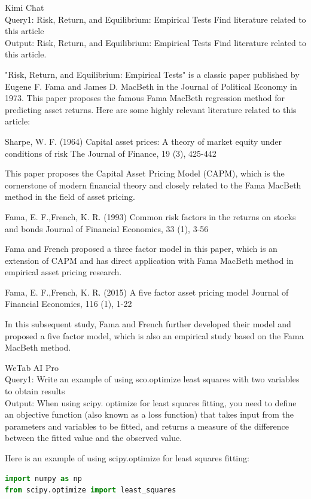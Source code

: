 \documentclass[12pt]{article}  %
\begin{document}
\begin{ReportAiUse}{9}
Kimi Chat  \\
Query1: Risk, Return, and Equilibrium: Empirical Tests Find literature related to this article  \\
Output:  Risk, Return, and Equilibrium: Empirical Tests Find literature related to this article.

"Risk, Return, and Equilibrium: Empirical Tests" is a classic paper published by Eugene F. Fama and James D. MacBeth in the Journal of Political Economy in 1973. This paper proposes the famous Fama MacBeth regression method for predicting asset returns. Here are some highly relevant literature related to this article:

Sharpe, W. F. (1964) Capital asset prices: A theory of market equity under conditions of risk The Journal of Finance, 19 (3), 425-442

This paper proposes the Capital Asset Pricing Model (CAPM), which is the cornerstone of modern financial theory and closely related to the Fama MacBeth method in the field of asset pricing.

Fama, E. F.,French, K. R. (1993) Common risk factors in the returns on stocks and bonds Journal of Financial Economics, 33 (1), 3-56

Fama and French proposed a three factor model in this paper, which is an extension of CAPM and has direct application with Fama MacBeth method in empirical asset pricing research.

Fama, E. F.,French, K. R. (2015) A five factor asset pricing model Journal of Financial Economics, 116 (1), 1-22

In this subsequent study, Fama and French further developed their model and proposed a five factor model, which is also an empirical study based on the Fama MacBeth method.


WeTab AI Pro \\
Query1: Write an example of using sco.optimize least squares with two variables to obtain results \\
Output: When using scipy. optimize for least squares fitting, you need to define an objective function (also known as a loss function) that takes input from the parameters and variables to be fitted, and returns a measure of the difference between the fitted value and the observed value.

Here is an example of using scipy.optimize for least squares fitting:
\begin{lstlisting}[language=Python]
import numpy as np
from scipy.optimize import least_squares


\end{lstlisting}
\end{ReportAiUse}
\end{document}
